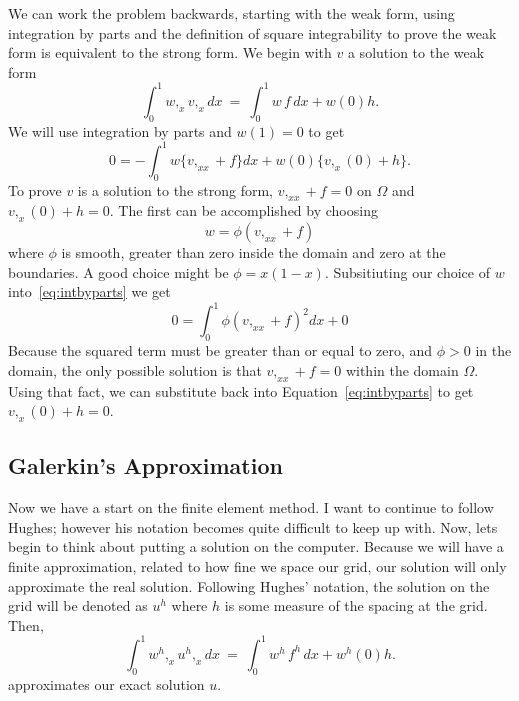 \documentclass{article}
\begin{document}
We can work the problem backwards, starting with the weak form, using
integration by parts and the definition of square integrability to prove the
weak form is equivalent to the strong form.  We begin with $v$ a solution to
the weak form
\begin{equation}
\int_0 ^1 w,_x v,_x dx ~=~ \int_0 ^1 w\, f\, dx + w(0) h.
\end{equation}
We will use integration by parts and $w(1)  = 0$ to get
\begin{equation} 
0 = -\int_0 ^1 w \{ v,_{xx} + f \} dx + w(0) \{ v,_x (0) + h \}.
\label{eq:intbyparts}
\end{equation}
To prove $v$ is a solution to the strong form, $ v,_{xx} + f = 0$ on
$\Omega$ and $v,_x (0) + h = 0$.   The first can be accomplished by choosing
\begin{equation}
w = \phi \left ( v,_{xx} + f \right )
\end{equation}
where $\phi$ is smooth, greater than zero inside the domain and zero at the
boundaries.   A good choice might be $\phi = x \left ( 1 -x \right )$.  
Subsitiuting our choice of $w$ into~\ref{eq:intbyparts} we get
\begin{equation} 
0 = \int _0 ^ 1 \phi \left ( v,_{xx} + f \right )^2 dx + 0
\end{equation}
Because the squared term must be greater than or equal to zero, and  $\phi >
0$ in the domain, the only possible solution is that $v,_{xx} + f = 0$ within
the domain $\Omega$.  Using that fact, we can substitute back into
Equation~\ref{eq:intbyparts} to get $v,_x (0) + h = 0$.

\subsection{Galerkin's Approximation}

Now we have a start on the finite element method.  I want to continue to follow
Hughes; however his notation becomes quite difficult to keep up with.  Now,
lets begin to think about putting a solution on the computer.   Because we will
have a finite approximation, related to how fine we space our grid, our
solution will only approximate the real solution.   Following Hughes' notation,
the solution on the grid will be denoted as $u^h$ where $h$ is some measure of
the spacing at the grid.   Then, 
\begin{equation}
\int_0 ^1 w^h,_x u^h,_x dx ~=~ \int_0 ^1 w^h\, f^h\, dx + w^h(0) h.
\label{eq:weak}
\end{equation}
approximates our exact solution $u$.
\end{document}
